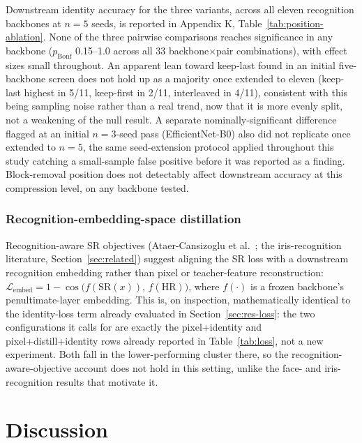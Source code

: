 \documentclass[pdflatex,sn-vancouver-num]{sn-jnl}
\begin{document}
Downstream identity accuracy for the three variants, across all eleven recognition backbones at $n=5$ seeds, is reported in Appendix K, Table~\ref{tab:position-ablation}. None of the three pairwise comparisons reaches significance in any backbone ($p_{\text{Bonf}}$ 0.15--1.0 across all 33 backbone$\times$pair combinations), with effect sizes small throughout. An apparent lean toward keep-last found in an initial five-backbone screen does not hold up as a majority once extended to eleven (keep-last highest in 5/11, keep-first in 2/11, interleaved in 4/11), consistent with this being sampling noise rather than a real trend, now that it is more evenly split, not a weakening of the null result. A separate nominally-significant difference flagged at an initial $n=3$-seed pass (EfficientNet-B0) also did not replicate once extended to $n=5$, the same seed-extension protocol applied throughout this study catching a small-sample false positive before it was reported as a finding. Block-removal position does not detectably affect downstream accuracy at this compression level, on any backbone tested.

\subsubsection{Recognition-embedding-space distillation}

Recognition-aware SR objectives (Ataer-Cansizoglu et al.~\cite{ataer2019identity}; the iris-recognition literature, Section~\ref{sec:related}) suggest aligning the SR loss with a downstream recognition embedding rather than pixel or teacher-feature reconstruction: $\mathcal{L}_{\text{embed}} = 1 - \cos\big(f(\mathrm{SR}(x)),\, f(\mathrm{HR})\big)$, where $f(\cdot)$ is a frozen backbone's penultimate-layer embedding. This is, on inspection, mathematically identical to the identity-loss term already evaluated in Section~\ref{sec:res-loss}: the two configurations it calls for are exactly the pixel+identity and pixel+distill+identity rows already reported in Table~\ref{tab:loss}, not a new experiment. Both fall in the lower-performing cluster there, so the recognition-aware-objective account does not hold in this setting, unlike the face- and iris-recognition results that motivate it.

\section{Discussion}
\label{sec:discussion}
\end{document}
